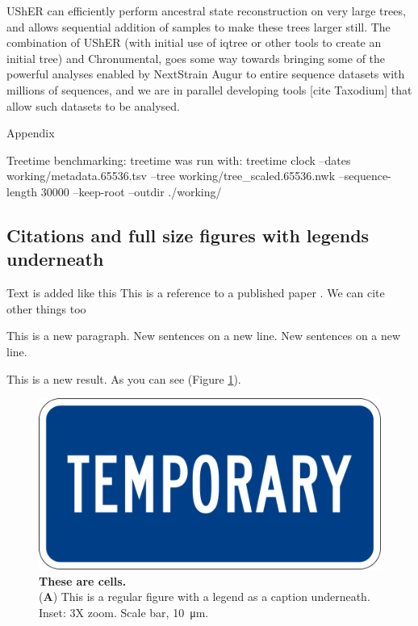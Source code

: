 UShER \cite{Turakhia2021-la} can efficiently perform ancestral state reconstruction on very large trees, and allows sequential addition of samples to make these trees larger still. The combination of UShER (with initial use of iqtree \cite{Minh2020-vc} or other tools to create an initial tree) and Chronumental, goes some way towards bringing some of the powerful analyses enabled by NextStrain Augur to entire sequence datasets with millions of sequences, and we are in parallel developing tools [cite Taxodium] that allow such datasets to be analysed.






Appendix

Treetime benchmarking: treetime was run with: treetime clock --dates working/metadata.65536.tsv --tree working/tree_scaled.65536.nwk --sequence-length 30000  --keep-root --outdir ./working/


\subsection*{Citations and full size figures with legends underneath}

Text is added like this
This is a reference to a published paper \citep{watson_molecular_1953}.
We can cite other things too \citep{tipton_complexities_2019,zheng_genome_2011,alberts_molecular_2002}

This is a new paragraph.
New sentences on a new line.
New sentences on a new line.

This is a new result.
As you can see (Figure \ref{fig:cells}).

\begin{figure}
\centering
\includegraphics[width=0.75\linewidth]{Figures/temp.png}
\caption{\textbf{These are cells.}\\
(\textbf{A}) This is a regular figure with a legend as a caption underneath. Inset: 3X zoom. Scale bar, \SI{10}{\micro\meter}.}
\label{fig:cells}
\end{figure}

